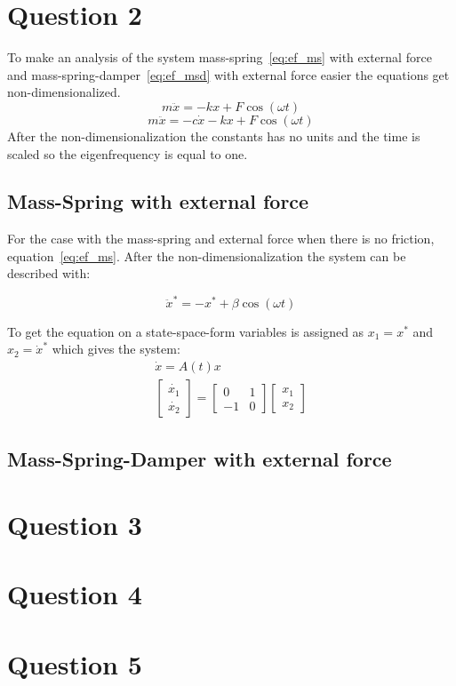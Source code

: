 \documentclass[
  twoside,
  11pt, a4paper,
  footinclude=true,
  headinclude=true,
  cleardoublepage=empty
]{scrbook}
\begin{document}
\chapter{Question 2}
To make an analysis of the system mass-spring~\eqref{eq:ef_ms} with external force and mass-spring-damper~\eqref{eq:ef_msd} with external force easier the equations get non-dimensionalized.
\begin{equation}\label{eq:ef_ms}
	m \ddot{x} = -k x + F \cos(\omega t)
\end{equation}
\begin{equation}\label{eq:ef_msd}
	m \ddot{x} = -c \dot{x} -k x + F \cos(\omega t)
\end{equation}
After the non-dimensionalization the constants has no units and the time is scaled so the eigenfrequency is equal to one. 

\section{Mass-Spring with external force}
For the case with the mass-spring and external force when there is no friction, equation~\eqref{eq:ef_ms}. After the non-dimensionalization the system can be described with:

\begin{equation}
	\ddot{x}^*=-x^*+\beta\cos(\omega t)
\end{equation}



To get the equation on a state-space-form variables is assigned as $x_1=x^*$ and $x_2=\dot{x}^*$ which gives the system:
\begin{equation}
	\begin{gathered}
		\dot{x}=A(t)x\\
		\begin{bmatrix}
			\dot{x_1}\\
			\dot{x_2}
		\end{bmatrix}=\begin{bmatrix}
			0	&	1\\
			-1	&	0
		\end{bmatrix}\begin{bmatrix}
			x_1\\
			x_2
		\end{bmatrix}
	\end{gathered}
\end{equation}

\section{Mass-Spring-Damper with external force}
\chapter{Question 3}


\chapter{Question 4}


\chapter{Question 5}



    
\end{document}
